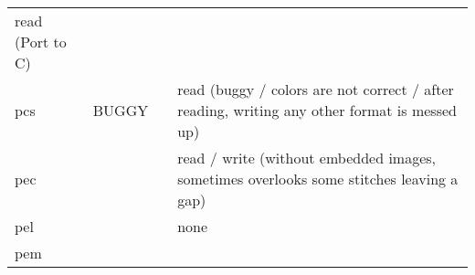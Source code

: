 \begin{longtable}[]{@{}llll@{}}
\begin{minipage}[t]{0.22\columnwidth}
read (Port to C)\strut
\end{minipage}\tabularnewline
\begin{minipage}[t]{0.19\columnwidth}\raggedright
pcs\strut
\end{minipage} & \begin{minipage}[t]{0.22\columnwidth}\raggedright
BUGGY\strut
\end{minipage} & \begin{minipage}[t]{0.25\columnwidth}\raggedright
\strut
\end{minipage} & \begin{minipage}[t]{0.22\columnwidth}\raggedright
read (buggy / colors are not correct / after reading, writing any other
format is messed up)\strut
\end{minipage}\tabularnewline
\begin{minipage}[t]{0.19\columnwidth}\raggedright
pec\strut
\end{minipage} & \begin{minipage}[t]{0.22\columnwidth}\raggedright
\strut
\end{minipage} & \begin{minipage}[t]{0.25\columnwidth}\raggedright
\strut
\end{minipage} & \begin{minipage}[t]{0.22\columnwidth}\raggedright
read / write (without embedded images, sometimes overlooks some stitches
leaving a gap)\strut
\end{minipage}\tabularnewline
\begin{minipage}[t]{0.19\columnwidth}\raggedright
pel\strut
\end{minipage} & \begin{minipage}[t]{0.22\columnwidth}\raggedright
\strut
\end{minipage} & \begin{minipage}[t]{0.25\columnwidth}\raggedright
\strut
\end{minipage} & \begin{minipage}[t]{0.22\columnwidth}\raggedright
none\strut
\end{minipage}\tabularnewline
\begin{minipage}[t]{0.19\columnwidth}\raggedright
pem\strut
\end{minipage} & \begin{minipage}[t]{0.22\columnwidth}\raggedright
\strut
\end{minipage} & \begin{minipage}[t]{0.25\columnwidth}\raggedright
\strut
\end{minipage} & \begin{minipage}[t]{0.22\columnwidth}\raggedright

\end{minipage}
\end{longtable}
